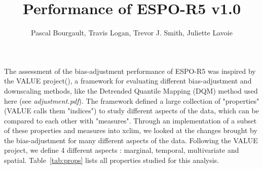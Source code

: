 \documentclass[letterpaper,10pt]{article}
\begin{document}
\title{Performance of ESPO-R5 v1.0}
\author{Pascal Bourgault, Travis Logan, Trevor J. Smith, Juliette Lavoie}
\maketitle

The assessment of the bias-adjustment performance of ESPO-R5 was inspired by the VALUE project(\cite{Maraun2015}), a framework for evaluating different bias-adjustment and downscaling methods, like the Detrended Quantile Mapping (DQM) method used here (see \emph{adjustment.pdf}). The framework defined a large collection of "properties" (VALUE calls them "indices") to study different aspects of the data, which can be compared to each other with "measures". Through an implementation of a subset of these properties and measures into xclim, we looked at the changes brought by the bias-adjustment for many different aspects of the data. Following the VALUE project, we define 4 different aspects : marginal, temporal, multivariate and spatial. Table~\ref{tab:props} lists all properties studied for this analysis.
\end{document}
